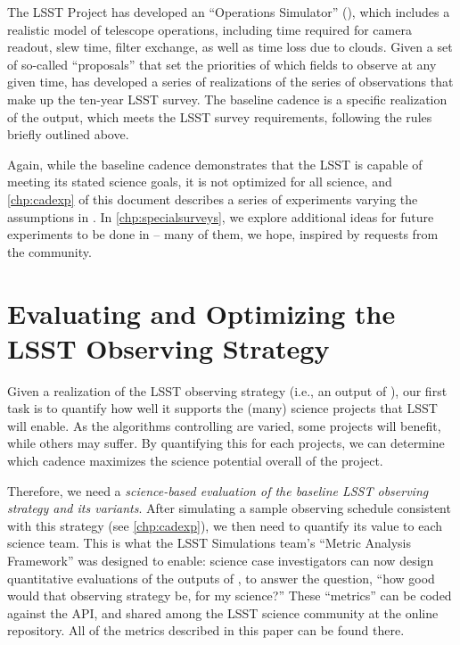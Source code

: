 The LSST Project has developed an ``Operations Simulator'' (\OpSim),
which
includes a realistic model of telescope operations, including time
required for camera readout, slew time, filter exchange, as well as time
loss due to clouds.  Given a set of so-called ``proposals''
that set the priorities of which fields to
observe at any given time, \OpSim has developed a series of realizations
of the series of observations that make up the ten-year LSST survey.
The baseline cadence is a specific realization of the
\OpSim output, which meets the LSST survey requirements, following the
rules briefly outlined above.

Again, while the baseline cadence demonstrates that the LSST is capable
of meeting its stated science goals, it is not optimized for all
science, and \autoref{chp:cadexp} of this document describes a
series of experiments varying the assumptions in \OpSim.  In
\autoref{chp:specialsurveys}, we explore additional ideas for future
experiments to be done in \OpSim -- many of them, we hope, inspired by
requests from the community.

\navigationbar


\section{Evaluating and Optimizing the LSST Observing Strategy}
\def\secname{intro:evaluation}\label{sec:\secname}


Given a realization of the LSST observing strategy (i.e., an output of
\OpSim), our first task is to quantify how well it supports the (many)
science projects that LSST will enable.  As the algorithms controlling
\OpSim are varied, some projects will benefit, while others may suffer.
By quantifying this for each projects, we can determine which cadence
maximizes the science potential overall of the project.

Therefore, we need a {\it science-based evaluation of the baseline LSST
observing strategy and its variants}. After simulating a sample
observing schedule consistent with this strategy (see
\autoref{chp:cadexp}), we then need to quantify its value to each
science team.  This is what the LSST Simulations team's ``Metric
Analysis Framework'' was designed to enable: science case investigators
can now design quantitative evaluations of the outputs of \OpSim, to
answer the question, ``how good would that observing strategy be, for my
science?'' These ``metrics'' can be coded against the \MAF API, and
shared among the LSST science community at the
\href{https://sims-maf.lsst.io/metricList.html#contributed-mafcontrib-metrics}{\simsMafContrib}
online repository. All of the \MAF metrics described in this paper can
be found there.

